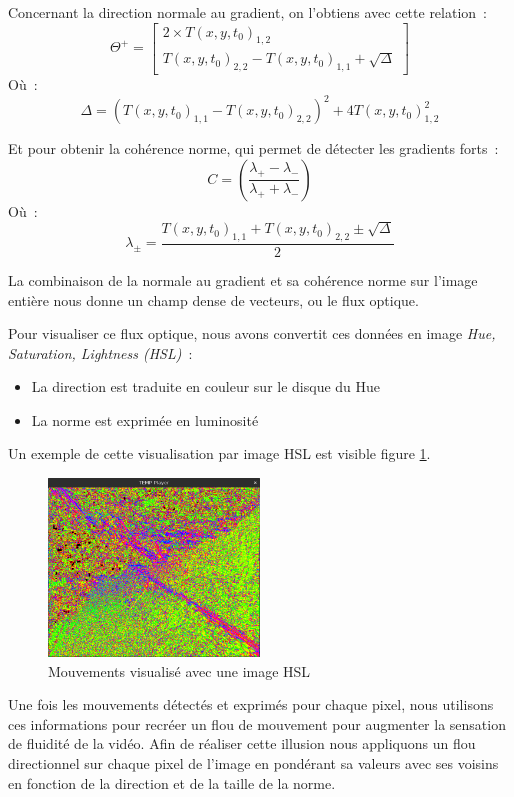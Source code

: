 \documentclass[fleqn,10pt]{SelfArx} %
\newcommand{\T}{T(x, y, t_{0})}
\begin{document}
Concernant la direction normale au gradient, on l'obtiens avec cette relation~:
\[
    \Theta^{+} = 
    \begin{bmatrix}
        2 \times \T_{1,2} \\
        \T_{2,2} - \T_{1,1} + \sqrt{\Delta}
    \end{bmatrix}
\]
Où~:
\[
    \Delta = (\T_{1,1} - \T_{2,2})^{2} + 4 \T_{1,2}^{2}
\]

Et pour obtenir la cohérence norme, qui permet de détecter les gradients forts~:
\[
    C = \left(\frac{\lambda_{+} - \lambda_{-}}{\lambda_{+} + \lambda_{-}}\right)
\]
Où~:
\[
    \lambda_{\pm} = \frac{\T_{1,1} + \T_{2,2} \pm \sqrt{\Delta}}{2}
\]

La combinaison de la normale au gradient et sa cohérence norme sur l'image entière nous donne un champ 
dense de vecteurs, ou le flux optique.

Pour visualiser ce flux optique, nous avons convertit ces données en image {\em Hue,
Saturation, Lightness (HSL)}~:
\begin{itemize}
    \item La direction est traduite en couleur sur le disque du Hue
    \item La norme est exprimée en luminosité
\end{itemize}

Un exemple de cette visualisation par image HSL est visible figure \ref{hsl}.
\begin{figure}[!ht]%
    \centering
    \includegraphics[width=0.5\textwidth]{img/hsl.png}
    \caption{Mouvements visualisé avec une image HSL}
    \label{hsl}
\end{figure}

Une fois les mouvements détectés et exprimés pour chaque pixel, nous utilisons ces informations pour recréer
un flou de mouvement pour augmenter la sensation de fluidité de la vidéo.
Afin de réaliser cette illusion nous appliquons un flou directionnel sur chaque pixel de l'image en pondérant
sa valeurs avec ses voisins en fonction de la direction et de la taille de la norme.
\end{document}
